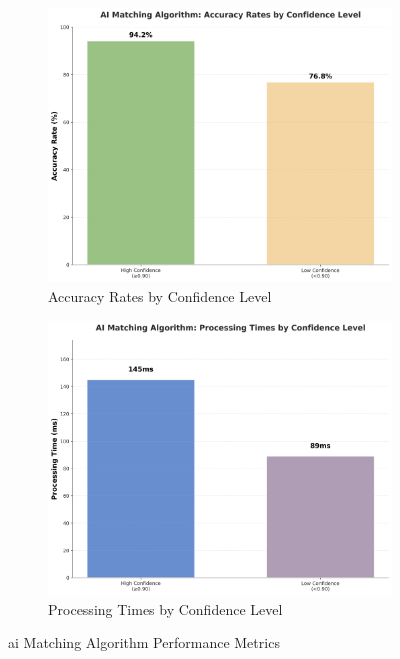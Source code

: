 \begin{figure}[htbp]
    \centering
    \begin{subfigure}[t]{0.48\textwidth}
        \centering
        \includegraphics[width=\textwidth]{figs/chapter5/ai_accuracy_rates.png}
        \caption{Accuracy Rates by Confidence Level}
        \label{fig:ai_accuracy}
    \end{subfigure}
    \hfill
    \begin{subfigure}[t]{0.48\textwidth}
        \centering
        \includegraphics[width=\textwidth]{figs/chapter5/ai_processing_times.png}
        \caption{Processing Times by Confidence Level}
        \label{fig:ai_processing}
    \end{subfigure}
    \caption{\acs{ai} Matching Algorithm Performance Metrics}
    \label{fig:ai_matching_system}
\end{figure}

